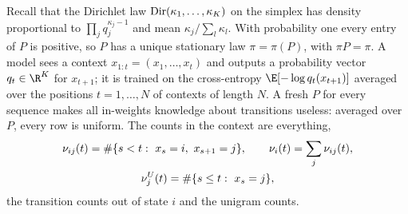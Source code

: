 \begin{refsection}

Recall that the Dirichlet law $\operatorname{Dir}(\kappa_1,\dots,\kappa_K)$ on the simplex has density proportional to $\prod_jq_j^{\kappa_j-1}$ and mean $\kappa_j/\sum_l\kappa_l$. With probability one every entry of $P$ is positive, so $P$ has a unique stationary law $\pi=\pi(P)$, with $\pi P=\pi$. A model sees a context $x_{1:t}=(x_1,\dots,x_t)$ and outputs a probability vector $q_t\in\R^K$ for $x_{t+1}$; it is trained on the cross-entropy $\E[-\log q_t(x_{t+1})]$ averaged over the positions $t=1,\dots,N$ of contexts of length $N$. A fresh $P$ for every sequence makes all in-weights knowledge about transitions useless: averaged over $P$, every row is uniform. The counts in the context are everything,
\begin{gather*}
  \nu_{ij}(t)=\#\{s<t:\ x_s=i,\ x_{s+1}=j\},\qquad \nu_i(t)=\sum_j\nu_{ij}(t),\\
  \nu_j^U(t)=\#\{s\le t:\ x_s=j\},
\end{gather*}
the transition counts out of state $i$ and the unigram counts.


\end{refsection}

